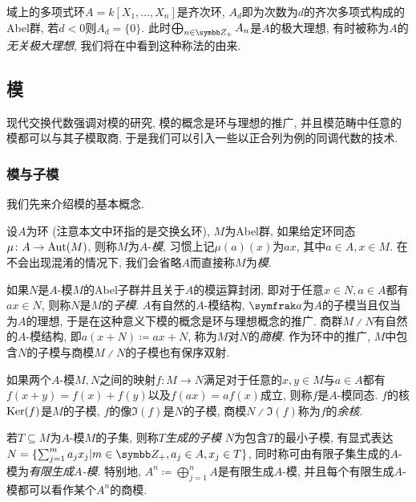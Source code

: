 \begin{example}
  域上的多项式环$A=k[X_1, \dotsc, X_n]$是齐次环, $A_d$即为次数为$d$的齐次多项式构成的Abel群, 若$d<0$则$A_d=\{0\}$. 此时$\bigoplus_{n\in\ZZ_+}A_n$是$A$的极大理想, 有时被称为$A$的\emph{无关极大理想}, 我们将在中看到这种称法的由来.
\end{example}


\subsection{模}

现代交换代数强调对模的研究, 模的概念是环与理想的推广, 并且模范畴中任意的模都可以与其子模取商, 于是我们可以引入一些以正合列为例的同调代数的技术.

\subsubsection{模与子模}

我们先来介绍模的基本概念.

\begin{definition}
  设$A$为环 (注意本文中环指的是交换幺环), $M$为Abel群, 如果给定环同态$\mu\colon A\to \operatorname{Aut}(M)$, 则称$M$为$A$-\emph{模}, 习惯上记$\mu(a)(x)$为$ax$, 其中$a\in A, x\in M$. 在不会出现混淆的情况下, 我们会省略$A$而直接称$M$为\emph{模}.
\end{definition}

如果$N$是$A$-模$M$的Abel子群并且关于$A$的模运算封闭, 即对于任意$x\in N, a\in A$都有$ax\in N$, 则称$N$是$M$的\emph{子模}. $A$有自然的$A$-模结构, $\ideal{a}$为$A$的子模当且仅当为$A$的理想, 于是在这种意义下模的概念是环与理想概念的推广. 商群$M{\divslash}N$有自然的$A$-模结构, 即$a(x+N)\coloneq ax+N$, 称为$M$对$N$的\emph{商模}. 作为环中的推广, $M$中包含$N$的子模与商模$M{\divslash}N$的子模也有保序双射.

如果两个$A$-模$M, N$之间的映射$f\colon M\to N$满足对于任意的$x, y\in M$与$a\in A$都有$f(x+y)=f(x)+f(y)$以及$f(ax)=af(x)$成立, 则称$f$是$A$-模同态. $f$的核$\operatorname{Ker} (f)$是$M$的子模, $f$的像$\Im (f)$是$N$的子模, 商模$N{\divslash}\Im (f)$称为$f$的\emph{余核}.

若$T\subseteq M$为$A$-模$M$的子集, 则称$T$\emph{生成的子模} $N$为包含$T$的最小子模, 有显式表达$N=\{\sum_{j=1}^m a_jx_j\vert m\in\ZZ_+, a_j\in A, x_j\in T\}$, 同时称可由有限子集生成的$A$-模为\emph{有限生成$A$-模}. 特别地, $A^n\coloneq \bigoplus_{j=1}^n A$是有限生成$A$-模, 并且每个有限生成$A$-模都可以看作某个$A^n$的商模.

